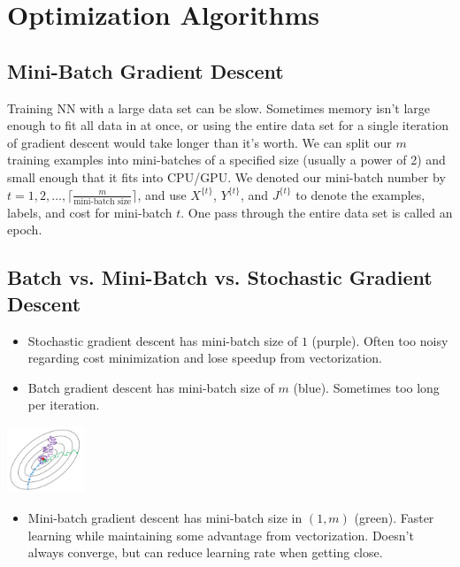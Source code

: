 \section{Optimization Algorithms}

\subsection{Mini-Batch Gradient Descent}

Training NN with a large data set can be slow. Sometimes memory isn't large enough to fit all data in at once, or using the entire data set for a single iteration of gradient descent would take longer than it's worth. We can split our $m$ training examples into mini-batches of a specified size (usually a power of 2) and small enough that it fits into CPU/GPU. We denoted our mini-batch number by $t = 1, 2, \dots, \lceil \frac{m}{\text{mini-batch size}} \rceil$, and use $X^{\{ t\}}$, $Y^{\{ t\}}$, and $J^{\{ t\}}$ to denote the examples, labels, and cost for mini-batch $t$. One pass through the entire data set is called an epoch. 

\subsection{Batch vs. Mini-Batch vs. Stochastic Gradient Descent}

\begin{multicols}{2}
\begin{itemize}[wide, labelwidth=!, labelindent=0pt]
\itemsep0em 
    \item Stochastic gradient descent has mini-batch size of $1$ (purple). Often too noisy regarding cost minimization and lose speedup from vectorization.
    \item Batch gradient descent has mini-batch size of $m$ (blue). Sometimes too long per iteration. \vspace*{-\baselineskip}
\end{itemize}
\includegraphics[width=2.3cm]{images/mini_batch_sizes.png}
\end{multicols}

\begin{itemize}[wide, labelwidth=!, labelindent=0pt]
\itemsep0em 
    \item Mini-batch gradient descent has mini-batch size in $(1,m)$ (green). Faster learning while maintaining some advantage from vectorization. Doesn't always converge, but can reduce learning rate when getting close. \vspace*{-\baselineskip}
\end{itemize}

